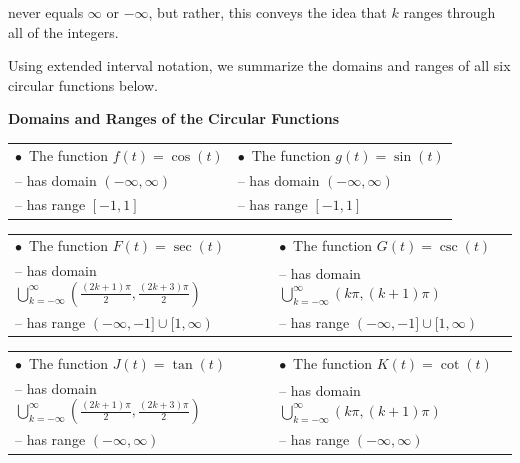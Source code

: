 \documentclass{ximera}
\begin{document}
 never equals $\infty$ or $-\infty$, but rather, this conveys the idea that $k$ ranges through all of the integers.  
 
 

Using extended interval notation, we summarize the domains and ranges of all six circular functions below.




\begin{theorem} \label{circularfunctionsdomainrange}  \textbf{Domains and Ranges of the Circular Functions} 

\begin{tabular}{ll}

$\bullet \, $ The function $f(t) = \cos(t)$ & $\bullet \, $ The function $g(t) = \sin(t)$ \\

\qquad -- has domain $(-\infty, \infty)$ & \qquad -- has domain $(-\infty, \infty)$ \\ [4pt]
\qquad  -- has range $[-1,1]$ & \qquad -- has range $[-1,1]$ \\

\end{tabular}



\begin{tabular}{ll}

$\bullet \, $ The function $F(t) = \sec(t)$ &   $\bullet \, $ The function $G(t) = \csc(t)$ \\
\qquad -- has domain $\bigcup_{k = -\infty}^{\infty} \left( \frac{(2k+1)\pi}{2}, \frac{(2k+3) \pi}{2} \right)$  &  \qquad -- has domain $\bigcup_{k = -\infty}^{\infty} \left(k \pi ,(k+1) \pi \right)$  \\ 
\qquad -- has range $(-\infty, -1] \cup [1, \infty) $ & \qquad  -- has range $(-\infty, -1] \cup [1, \infty) $ \\

\end{tabular}



\begin{tabular}{ll}

$\bullet \, $ The function $J(t) = \tan(t)$ &   $\bullet \, $ The function $K(t) = \cot(t)$ \\
\qquad -- has domain $\bigcup_{k = -\infty}^{\infty} \left( \frac{(2k+1)\pi}{2}, \frac{(2k+3) \pi}{2} \right)$  &  \qquad -- has domain $\bigcup_{k = -\infty}^{\infty} \left(k \pi ,(k+1) \pi \right)$   \\ 
\qquad -- has range $(-\infty, \infty) $ &  \qquad -- has range $(-\infty, \infty) $ \\ 

\end{tabular}

\end{theorem}







\closegraphsfile
\end{document}
